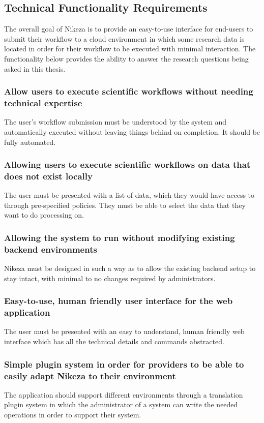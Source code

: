 \subsection{Technical Functionality Requirements}

The overall goal of Nikeza is to provide an easy-to-use interface for end-users to submit their workflow to a cloud environment in which some research data is located in order for their workflow to be executed with minimal interaction. The functionality below provides the ability to answer the research questions being asked in this thesis.

\subsubsection{Allow users to execute scientific workflows without needing technical expertise}

The user's workflow submission must be understood by the system and automatically executed without leaving things behind on completion. It should be fully automated.

\subsubsection{Allowing users to execute scientific workflows on data that does not exist locally}

The user must be presented with a list of data, which they would have access to through pre-specified policies. They must be able to select the data that they want to do processing on.

\subsubsection{Allowing the system to run without modifying existing backend environments}

Nikeza must be designed in such a way as to allow the existing backend setup to stay intact, with minimal to no changes required by administrators. 

\subsubsection{Easy-to-use, human friendly user interface for the web application}

The user must be presented with an easy to understand, human friendly web interface which has all the technical details and commands abstracted.

\subsubsection{Simple plugin system in order for providers to be able to easily adapt Nikeza to their environment}

The application should support different environments through a translation plugin system in which the administrator of a system can write the needed operations in order to support their system.